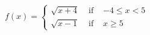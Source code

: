 {${\displaystyle f(x) = \left\{ \begin{array}{rcl} \sqrt{x + 4} & \mbox{ if } & -4 \leq x < 5 \\
                                                        \sqrt{x - 1} & \mbox{ if } & x \geq 5
                                     \end{array} \right. }$}
{
\begin{center}
\end{center}
}